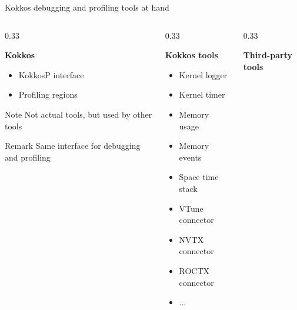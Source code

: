 \documentclass[
    aspectratio=169,
    \createHandout
]{beamer}
\begin{document}
\begin{frame}{Kokkos debugging and profiling tools at hand}
    \begin{columns}[T]
        \begin{column}{0.33\linewidth}
            \begin{center}
                \textbf{Kokkos}
            \end{center}
            \begin{itemize}
                \item KokkosP interface
                \item Profiling regions
            \end{itemize}
            \begin{block}{Note}
                Not actual tools, but used by other tools
            \end{block}
            \begin{block}{Remark}
                Same interface for debugging and profiling
            \end{block}
        \end{column}
        \pause
        \begin{column}{0.33\linewidth}
            \begin{center}
                \textbf{Kokkos tools}
            \end{center}
            \begin{itemize}
                \item Kernel logger
                \item Kernel timer
                \item Memory usage
                \item Memory events
                \item Space time stack
                \item VTune connector
                \item NVTX connector
                \item ROCTX connector
                \item ...
            \end{itemize}
        \end{column}
        \pause
        \begin{column}{0.33\linewidth}
            \begin{center}
                \textbf{Third-party tools}
            \end{center}
            \begin{itemize}

\end{itemize}
\end{column}
\end{columns}
\end{frame}
\end{document}
